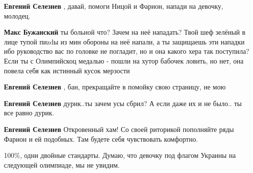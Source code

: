 \begin{itemize}
\begin{itemize}
\textbf{Евгений Селезнев} , давай, помоги Ницой и Фарион, напади на девочку, молодец.

 
\textbf{Макс Бужанский} ты больной что? Зачем на неё нападать? Твой шеф зелёный
в лице тупой пиzdы из мин обороны на неё напали, а ты защищаешь эти нападки ибо
руководство вас по головке не погладит, но и она какого хера так поступила?
Если ты с Олимпийскоц медалью - пошли на хутор бабочек ловить, но нет, она
повела себя как истинный кусок мерзости

 
\textbf{Евгений Селезнев} , бан, прекращайте в помойку свою страницу, не мою

 
\textbf{Евгений Селезнев} дурик..ты зачем усы сбрил? А если даже их и не было.. ты все равно дурик.

 
\textbf{Евгений Селезнев} Откровенный хам! Со своей риторикой пополняйте ряды Фарион и ей подобных. Там будете себя чувствовать комфортно.
\end{itemize}

 
100\%, одни двойные стандарты. Думаю, что девочку под флагом Украины на следующей олимпиаде, мы не увидим.


\end{itemize}
